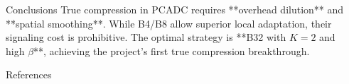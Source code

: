 \documentclass[final]{beamer}
\newlength{\sepwidth}
\newlength{\colwidth}
\newcommand{\separatorcolumn}{\begin{column}{\sepwidth}\end{column}}
\begin{document}
\begin{frame}[t]
\begin{columns}[t]
\begin{column}{\colwidth}
\begin{block}{Conclusions}
True compression in PCADC requires **overhead dilution** and **spatial smoothing**. While B4/B8 allow superior local adaptation, their signaling cost is prohibitive. The optimal strategy is **B32 with $K=2$ and high $\beta$**, achieving the project's first true compression breakthrough.
\end{block}

\begin{block}{References}
\footnotesize{}
\end{block}

\end{column}
\separatorcolumn
\end{columns}
\end{frame}
\end{document}
